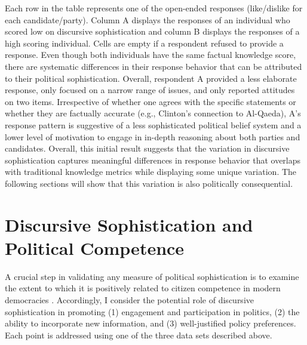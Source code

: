 Each row in the table represents one of the open-ended responses (like/dislike for each candidate/party). Column A displays the responses of an individual who scored low on discursive sophistication and column B displays the responses of a high scoring individual. Cells are empty if a respondent refused to provide a response. Even though both individuals have the same factual knowledge score, there are systematic differences in their response behavior that can be attributed to their political sophistication. Overall, respondent A provided a less elaborate response, only focused on a narrow range of issues, and only reported attitudes on two items. Irrespective of whether one agrees with the specific statements or whether they are factually accurate (e.g., Clinton's connection to Al-Qaeda), A's response pattern is suggestive of a less sophisticated political belief system and a lower level of motivation to engage in in-depth reasoning about both parties and candidates. Overall, this initial result suggests that the variation in discursive sophistication captures meaningful differences in response behavior that overlaps with traditional knowledge metrics while displaying some unique variation. The following sections will show that this variation is also politically consequential.



\section*{Discursive Sophistication and Political Competence}

A crucial step in validating any measure of political sophistication is to examine the extent to which it is positively related to citizen competence in modern democracies \citep{lupia2006elitism,lupia2015uninformed}. Accordingly, I consider the potential role of discursive sophistication in promoting (1) engagement and participation in politics, (2) the ability to incorporate new information, and (3) well-justified policy preferences. Each point is addressed using one of the three data sets described above.


